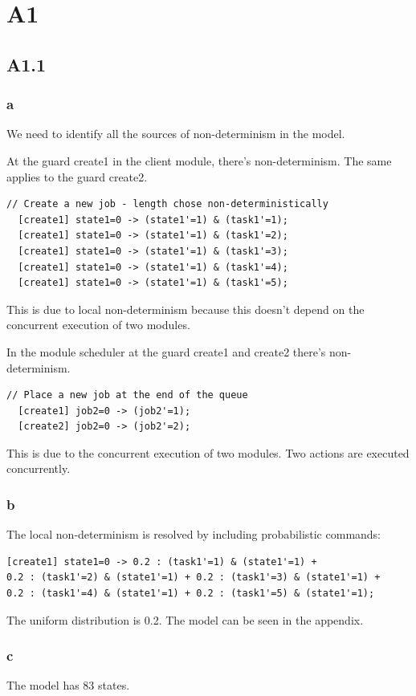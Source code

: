 
\section{A1}

\subsection{A1.1}

\subsubsection{a}

We need to identify all the sources of non-determinism in the model. 

At the guard create1 in the client module, there's non-determinism. The same applies to the guard create2.
\begin{verbatim}
// Create a new job - length chose non-deterministically
  [create1] state1=0 -> (state1'=1) & (task1'=1);
  [create1] state1=0 -> (state1'=1) & (task1'=2);
  [create1] state1=0 -> (state1'=1) & (task1'=3);
  [create1] state1=0 -> (state1'=1) & (task1'=4);
  [create1] state1=0 -> (state1'=1) & (task1'=5);
\end{verbatim}
This is due to local non-determinism because this doesn't depend on the concurrent execution of two modules.

In the module scheduler at the guard create1 and create2 there's non-determinism.
\begin{verbatim}
// Place a new job at the end of the queue
  [create1] job2=0 -> (job2'=1);
  [create2] job2=0 -> (job2'=2);
\end{verbatim}
This is due to the concurrent execution of two modules. Two actions are executed concurrently.

\subsubsection{b}
The local non-determinism is resolved by including probabilistic commands:
\begin{verbatim}
[create1] state1=0 -> 0.2 : (task1'=1) & (state1'=1) + 
0.2 : (task1'=2) & (state1'=1) + 0.2 : (task1'=3) & (state1'=1) + 
0.2 : (task1'=4) & (state1'=1) + 0.2 : (task1'=5) & (state1'=1);
\end{verbatim}
The uniform distribution is 0.2. The model can be seen in the appendix.

\subsubsection{c}
The model has 83 states.

